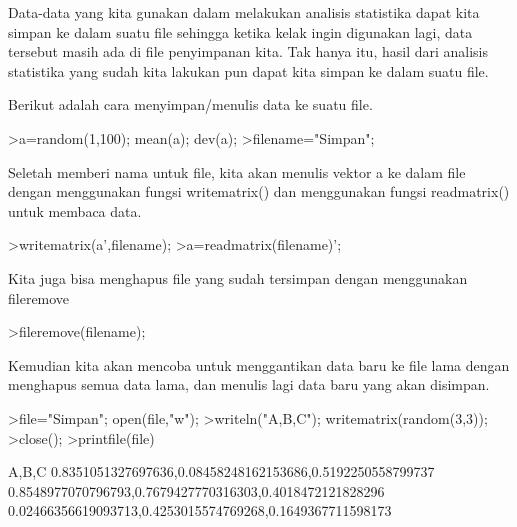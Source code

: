 \documentclass[a4paper,10pt]{article}
\begin{document}
\begin{eulernotebook}
\begin{eulercomment}
\begin{eulercomment}
\begin{eulercomment}
\begin{eulercomment}
\begin{eulercomment}
\begin{eulercomment}
\begin{eulercomment}
\begin{eulercomment}
\begin{eulercomment}
\begin{eulercomment}
\begin{eulercomment}
\begin{eulercomment}
\begin{eulercomment}
\begin{eulercomment}
\begin{eulercomment}
\begin{eulercomment}
\begin{eulercomment}
\begin{eulercomment}
\begin{eulercomment}
\begin{eulercomment}
\begin{eulercomment}
Data-data yang kita gunakan dalam melakukan analisis statistika dapat
kita simpan ke dalam suatu file sehingga ketika kelak ingin digunakan
lagi, data tersebut masih ada di file penyimpanan kita. Tak hanya itu,
hasil dari analisis statistika yang sudah kita lakukan pun dapat kita
simpan ke dalam suatu file.

Berikut adalah cara menyimpan/menulis data ke suatu file.
\end{eulercomment}
\begin{eulerprompt}
>a=random(1,100); mean(a); dev(a);
>filename="Simpan";
\end{eulerprompt}
\begin{eulercomment}
Seletah memberi nama untuk file, kita akan menulis vektor a ke dalam
file dengan menggunakan fungsi writematrix() dan menggunakan fungsi
readmatrix() untuk membaca data.
\end{eulercomment}
\begin{eulerprompt}
>writematrix(a',filename);
>a=readmatrix(filename)';
\end{eulerprompt}
\begin{eulercomment}
Kita juga bisa menghapus file yang sudah tersimpan dengan menggunakan
fileremove
\end{eulercomment}
\begin{eulerprompt}
>fileremove(filename);
\end{eulerprompt}
\begin{eulercomment}
Kemudian kita akan mencoba untuk menggantikan data baru ke file lama
dengan menghapus semua data lama, dan menulis lagi data baru yang akan
disimpan.
\end{eulercomment}
\begin{eulerprompt}
>file="Simpan"; open(file,"w");
>writeln("A,B,C"); writematrix(random(3,3));
>close();
>printfile(file)
\end{eulerprompt}
\begin{euleroutput}
  A,B,C
  0.8351051327697636,0.08458248162153686,0.5192250558799737
  0.8548977070796793,0.7679427770316303,0.4018472121828296
  0.02466356619093713,0.4253015574769268,0.1649367711598173
  

\end{euleroutput}
\end{eulercomment}
\end{eulercomment}
\end{eulercomment}
\end{eulercomment}
\end{eulercomment}
\end{eulercomment}
\end{eulercomment}
\end{eulercomment}
\end{eulercomment}
\end{eulercomment}
\end{eulercomment}
\end{eulercomment}
\end{eulercomment}
\end{eulercomment}
\end{eulercomment}
\end{eulercomment}
\end{eulercomment}
\end{eulercomment}
\end{eulercomment}
\end{eulercomment}
\end{eulernotebook}
\end{document}
